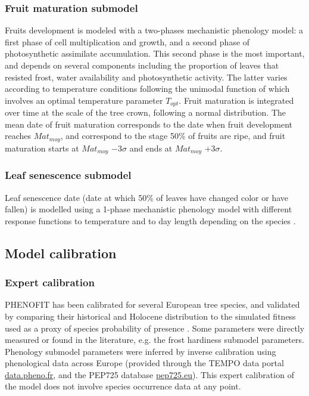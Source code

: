 \documentclass[preprint,12pt,authoryear]{elsarticle}
\begin{document}
\subsubsection{Fruit maturation submodel}

Fruits development is modeled with a two-phases mechanistic phenology model:  a first phase of cell multiplication and growth, and a second phase of photosynthetic assimilate accumulation. This second phase is the most important, and depends on several components including the proportion of leaves that resisted frost, water availability and photosynthetic activity. The latter varies according to temperature conditions following the unimodal function of \citet{Wang1998} which involves an optimal temperature parameter $T_{opt}$.  Fruit maturation is integrated over time at the scale of the tree crown, following a normal distribution. The mean date of fruit maturation corresponds to the date when fruit development reaches $Mat_{moy}$, and correspond to the stage 50\% of fruits are ripe,  and fruit maturation starts at $Mat_{moy}$ $-3\sigma$ and ends at $Mat_{moy}$ $+3\sigma$.

\subsubsection{Leaf senescence submodel}
Leaf senescence date (date at which 50\% of leaves have changed color or have fallen) is modelled using a 1-phase mechanistic phenology model with different response functions to temperature and to day length depending on the species \citep{Delpierre2009}. 

\subsection{Model calibration}

\subsubsection{Expert calibration}

PHENOFIT has been calibrated for several European tree species, and validated  by comparing their historical and Holocene distribution to the simulated fitness used as a proxy of species probability of presence  \citep{Saltre2013, Duputie2015, Gauzere2020, VanderMeersch2024}. Some parameters were directly measured or found in the literature, e.g. the frost hardiness submodel parameters. Phenology submodel parameters were inferred by inverse \textcolor{customred}{calibration} using phenological data across Europe (provided through the TEMPO data portal \url{data.pheno.fr}, and the PEP725 database \url{pep725.eu}). %
This expert calibration of the model does not involve species occurrence data at any point.
\end{document}

